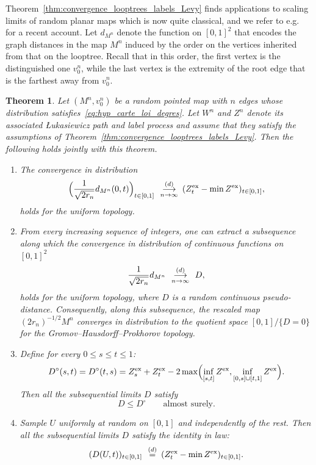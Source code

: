 \documentclass[british, a4paper,11pt]{article}
\numberwithin{equation}{section}
\newtheorem{thm}{\bfseries \upshape Theorem}[section]
\theoremstyle{definition}
\newcommand{\cvloi}[1][n]{\enskip\mathop{\longrightarrow}^{(d)}_{#1 \to \infty}\enskip}
\newcommand{\eqloi}[1][n]{\enskip\mathop{=}^{(d)}_{}\enskip}
\newcommand{\exc}{\mathrm{ex}}
\begin{document}
Theorem~\ref{thm:convergence_looptrees_labels_Levy} finds applications to scaling limits of random planar maps which is now quite classical, and we refer to e.g.~\cite[Section~2.4]{Mar24} for a recent account.
Let $d_{M^n}$ denote the function on $[0,1]^2$ that encodes the graph distances in the map $M^n$ induced by the order on the vertices inherited from that on the looptree.
Recall that in this order, the first vertex is the distinguished one $v_0^n$, while the last vertex is the extremity of the root edge that is the farthest away from $v_0^n$.



\begin{thm}\label{thm:convergence_cartes_Boltzmann_Levy}
Let $(M^n, v_0^n)$ be a random pointed map with $n$ edges whose distribution satisfies~\eqref{eq:hyp_carte_loi_degres}.
Let $W^n$ and $Z^n$ denote its associated {\L}ukasiewicz path and label process and assume that they satisfy the assumptions of Theorem~\ref{thm:convergence_looptrees_labels_Levy}.
Then the following holds jointly with this theorem.
\begin{enumerate}
\item The convergence in distribution
\[\Bigl(\frac{1}{\sqrt{2 r_n}}d_{M^n}(0, t)\Bigr)_{t \in [0,1]} \cvloi (Z^{\exc}_t - \min Z^{\exc})_{t \in [0,1]},\]
holds for the uniform topology. 
\item From every increasing sequence of integers, one can extract a subsequence along which 
the convergence in distribution
of continuous functions on $[0,1]^2$
\[\frac{1}{\sqrt{2 r_n}} d_{M^n} \cvloi D,\]
holds for the uniform topology, where $D$ is a random continuous pseudo-distance.
Consequently, along this subsequence, 
the rescaled map $(2 r_n)^{-1/2} M^n$ converges in distribution to the quotient space $[0,1]/\{D=0\}$ for the Gromov--Hausdorff--Prokhorov topology.

\item Define for every $0 \le s \le t \le 1$:
\begin{equation}\label{eq:non_distance_label}
D^\circ(s,t) = D^\circ(t,s) = Z^{\exc}_s + Z^{\exc}_t - 2 \max\Bigl(\inf_{[s,t]} Z^{\exc}, \inf_{[0,s] \cup [t,1]} Z^{\exc}\Bigr)
.\end{equation}
Then all the subsequential limits $D$ satisfy
\[D \leq D^\circ \qquad\text{almost surely}.\]

\item Sample $U$ uniformly at random on $[0,1]$ and independently of the rest. Then all the subsequential limits $D$ satisfy the identity in law:
\[(D(U,t))_{t \in [0,1]} \eqloi (Z^{\exc}_t - \min Z^{\exc})_{t \in [0,1]}.\]


\end{enumerate}
\end{thm}
\end{document}

